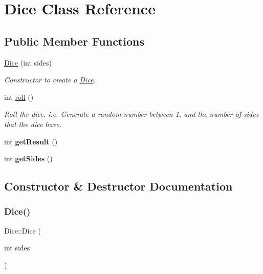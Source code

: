 \hypertarget{class_dice}{}\section{Dice Class Reference}
\label{class_dice}
\subsection*{Public Member Functions}
\begin{DoxyCompactItemize}
\item 
\hyperlink{class_dice_a7509585b71b23823f0ce2e24c94d222b}{Dice} (int sides)
\begin{DoxyCompactList}\small\item\em Constructor to create a \hyperlink{class_dice}{Dice}. \end{DoxyCompactList}\item 
int \hyperlink{class_dice_a612a16c434160895563d19099ca0b33b}{roll} ()
\begin{DoxyCompactList}\small\item\em Roll the dice. i.\+e. Generate a random number between 1, and the number of sides that the dice have. \end{DoxyCompactList}\item 
\hypertarget{class_dice_a30ec91b45079fdb6e37b52a6e9b1a401}{}\label{class_dice_a30ec91b45079fdb6e37b52a6e9b1a401} 
int {\bfseries get\+Result} ()
\item 
\hypertarget{class_dice_af18ffbed87a3ffa3e810d7524623cc00}{}\label{class_dice_af18ffbed87a3ffa3e810d7524623cc00} 
int {\bfseries get\+Sides} ()
\end{DoxyCompactItemize}


\subsection{Constructor \& Destructor Documentation}
\hypertarget{class_dice_a7509585b71b23823f0ce2e24c94d222b}{}\label{class_dice_a7509585b71b23823f0ce2e24c94d222b} 
\subsubsection{\texorpdfstring{Dice()}{Dice()}}
{\footnotesize\ttfamily Dice\+::\+Dice (\begin{DoxyParamCaption}\item[{int}]{sides }\end{DoxyParamCaption})\hspace{0.3cm}{\ttfamily [explicit]}}



